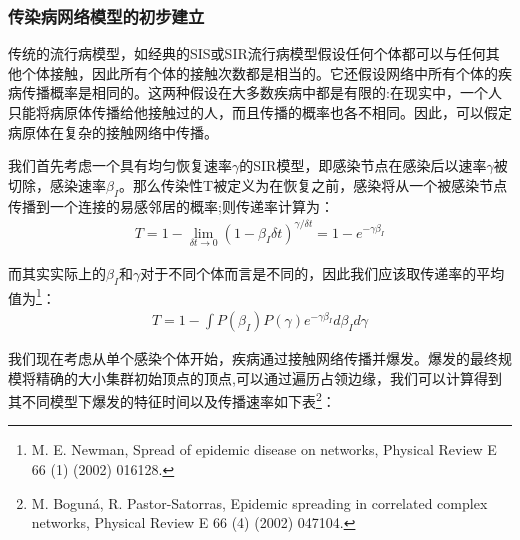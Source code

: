 \documentclass[UTF8]{ctexart}
\begin{document}
\subsubsection{传染病网络模型的初步建立}
传统的流行病模型，如经典的SIS或SIR流行病模型假设任何个体都可以与任何其他个体接触，因此所有个体的接触次数都是相当的。它还假设网络中所有个体的疾病传播概率是相同的。这两种假设在大多数疾病中都是有限的:在现实中，一个人只能将病原体传播给他接触过的人，而且传播的概率也各不相同。因此，可以假定病原体在复杂的接触网络中传播。
\par 我们首先考虑一个具有均匀恢复速率$\gamma$的SIR模型，即感染节点在感染后以速率$\gamma$被切除，感染速率$\beta_{I}$。那么传染性T被定义为在恢复之前，感染将从一个被感染节点传播到一个连接的易感邻居的概率;则传递率计算为：
\begin{equation}
	\begin{aligned}
		T=1-\lim\limits_{\delta t\to 0}(1-\beta_{I}\delta t)^{\gamma/\delta t}=1-e^{-\gamma\beta_{I}}
	\end{aligned}
\end{equation}
\par 而其实实际上的$\beta_{I}$和$\gamma$对于不同个体而言是不同的，因此我们应该取传递率的平均值为\footnote{M. E. Newman, Spread of epidemic disease on networks, Physical Review E 66 (1) (2002) 016128.}：
\begin{equation}
	\begin{aligned}
		T=1-\int P(\beta_{I})P(\gamma)e^{-\gamma\beta_{I}}d\beta_{I}d\gamma
	\end{aligned}
\end{equation}
\par 我们现在考虑从单个感染个体开始，疾病通过接触网络传播并爆发。爆发的最终规模将精确的大小集群初始顶点的顶点,可以通过遍历占领边缘，我们可以计算得到其不同模型下爆发的特征时间以及传播速率如下表\footnote{M. Boguná, R. Pastor-Satorras, Epidemic spreading in correlated complex networks, Physical Review E 66 (4) (2002)
	047104.}：
\end{document}

